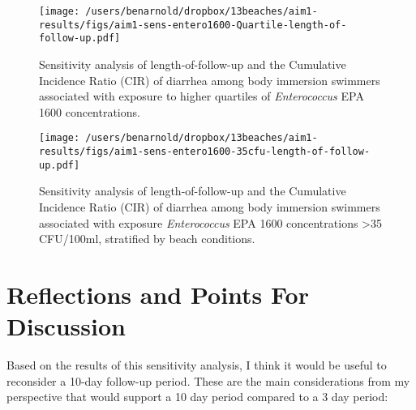 \documentclass[11pt]{article}
\begin{document}
\clearpage
\begin{figure}[htbp]
\begin{center}
\texttt{[image: /users/benarnold/dropbox/13beaches/aim1-results/figs/aim1-sens-entero1600-Quartile-length-of-follow-up.pdf]}
\begin{minipage}{0.8\textwidth}
\caption{Sensitivity analysis of length-of-follow-up and the Cumulative Incidence Ratio (CIR) of diarrhea among body immersion swimmers associated with exposure to higher quartiles of \textit{Enterococcus} EPA 1600 concentrations.}
\label{fig:entero1600q}
\end{minipage}
\end{center}
\end{figure}

\clearpage
\begin{figure}[htbp]
\begin{center}
\texttt{[image: /users/benarnold/dropbox/13beaches/aim1-results/figs/aim1-sens-entero1600-35cfu-length-of-follow-up.pdf]}
\begin{minipage}{0.8\textwidth}
\caption{Sensitivity analysis of length-of-follow-up and the Cumulative Incidence Ratio (CIR) of diarrhea among body immersion swimmers associated with exposure \textit{Enterococcus} EPA 1600 concentrations >35 CFU/100ml, stratified by beach conditions.}
\label{fig:entero1600cfu35}
\end{minipage}
\end{center}
\end{figure}

\clearpage
\section*{Reflections and Points For Discussion}

Based on the results of this sensitivity analysis, I think it would be useful to reconsider a 10-day follow-up period.  These are the main considerations from my perspective that would support a 10 day period compared to a 3 day period:
\end{document}
